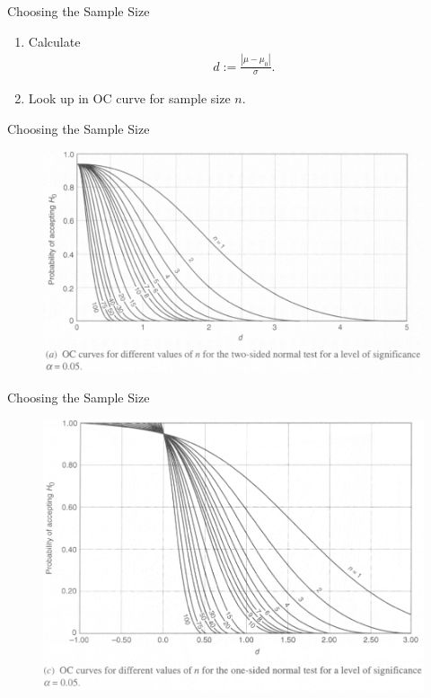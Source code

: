 \begin{frame}{Choosing the Sample Size}

\begin{enumerate}
	\item Calculate
	\begin{align*}
	d := \frac{|\mu - \mu_0|}{\sigma}.
	\end{align*}
	\item Look up in OC curve for sample size $n$.
\end{enumerate}

\end{frame}


\begin{frame}{Choosing the Sample Size}

\begin{figure}[htbp]
	\centering
	\includegraphics[width=\linewidth]{./images/rc5fig3.png}
\end{figure}

\end{frame}


\begin{frame}{Choosing the Sample Size}

\begin{figure}[htbp]
	\centering
	\includegraphics[width=\linewidth]{./images/rc5fig4.png}
\end{figure}

\end{frame}


